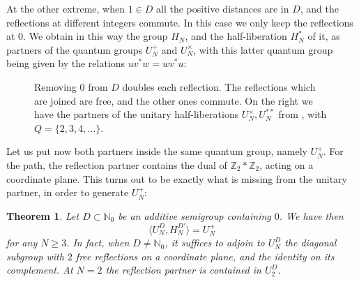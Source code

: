 \documentclass[11pt,a4paper]{article}
\newtheorem{introthm}{Theorem}
\begin{document}
At the other extreme, when $1\in D$ all the positive distances are in $D$, and the reflections at different integers commute. In this case we only keep the reflections at $0$. We obtain in this way the group $H_N$, and the half-liberation $H_N^*$ of it, as partners of the quantum groups $U_N^+$ and $U_N^\times$, with this latter quantum group being given by the relations $uv^*w=wv^*u$:

\begin{figure}[H]
\centering
{}
\caption{Removing $0$ from $D$ doubles each reflection. The reflections which are joined are free, and the other ones commute. On the right we have the partners of the unitary half-liberations $U_N^\times,U_N^{**}$ from \cite{semi}, with $Q=\{2,3,4,\ldots\}$.}
\label{double-picture}
\end{figure}

Let us put now both partners inside the same quantum group, namely $U_N^+$. For the path, the reflection partner contains the dual of $\mathbb Z_2*\mathbb Z_2$, acting on a coordinate plane. This turns out to be exactly what is missing from the unitary partner, in order to generate $U_N^+$:

\begin{introthm}\label{intro-joint}
Let $D\subset\mathbb N_0$ be an additive semigroup containing $0$. We have then
\[
 \big\langle U_N^D,H_N^{D'}\big\rangle=U_N^+
\]
for any $N\geq3$. In fact, when $D\neq\mathbb N_0$, it suffices to adjoin to $U_N^D$ the diagonal subgroup with $2$ free reflections on a coordinate plane, and the identity on its complement. At $N=2$ the reflection partner is contained in $U_2^D$.
\end{introthm}
\end{document}
